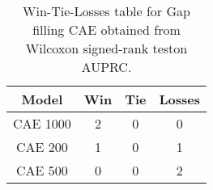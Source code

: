\begin{table}[H]
\centering
\begin{tabular}{|c|c|c|c|}

\textbf{Model} &  \textbf{Win} &  \textbf{Tie} &  \textbf{Losses} \\
\hline

      CAE 1000 &             2 &             0 &                0 \\
\hline
       CAE 200 &             1 &             0 &                1 \\
\hline
       CAE 500 &             0 &             0 &                2 \\
\hline

\end{tabular}
\caption{Win-Tie-Losses table for Gap filling CAE obtained from Wilcoxon signed-rank teston AUPRC.}
\label{tab:gap_filling_cae_model_comparison}
\end{table}
